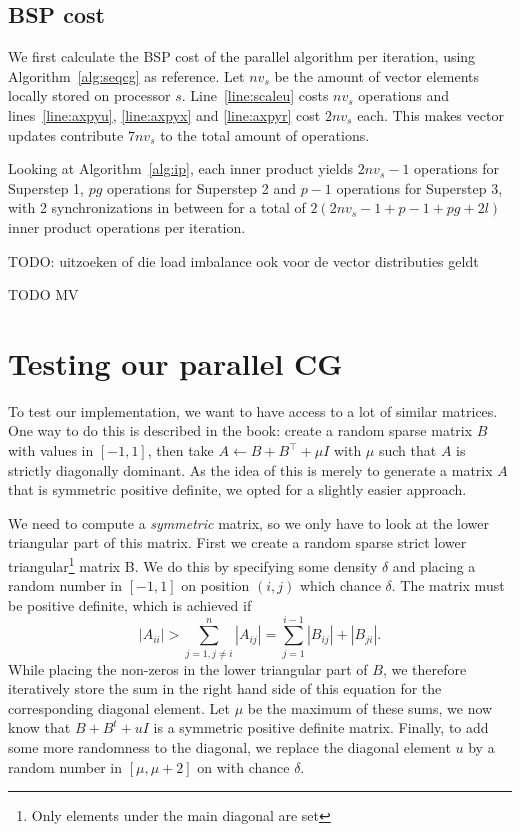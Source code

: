 \documentclass[11pt]{amsart}
\theoremstyle{definition}
\begin{document}
\subsection{BSP cost}
We first calculate the BSP cost of the parallel algorithm per iteration, using Algorithm~\ref{alg:seqcg} as reference. Let $nv_s$ be the amount of vector elements locally stored on processor $s$. Line~\ref{line:scaleu} costs $nv_s$ operations and lines~\ref{line:axpyu}, \ref{line:axpyx} and \ref{line:axpyr} cost $2nv_s$ each. This makes vector updates contribute $7nv_s$ to the total amount of operations. 

Looking at Algorithm~\ref{alg:ip}, each inner product yields $2nv_s - 1$ operations for Superstep 1, $pg$ operations for Superstep 2 and $p-1$ operations for Superstep 3, with 2 synchronizations in between for a total of $2(2nv_s - 1 + p-1 + pg + 2l)$ inner product operations per iteration.

TODO: uitzoeken of die load imbalance ook voor de vector distributies geldt

TODO MV

\section{Testing our parallel CG}
To test our implementation, we want to have access to a lot of similar matrices. One way to do this is described in the book: create a random sparse matrix $B$ with values in $[-1,1]$, then take $A \gets B + B^\top + \mu I$ with $\mu$ such that $A$ is strictly diagonally dominant. As the idea of this is merely to generate a matrix $A$ that is symmetric positive definite, we opted for a slightly easier approach. 

We need to compute a \emph{symmetric} matrix, so we only have to look at the lower triangular part of this matrix. First we create a 
random sparse strict lower triangular\footnote{Only elements under the main diagonal are set} matrix B. We do this by specifying some
density $\delta$ and placing a random number in $[-1,1]$ on position $(i,j)$ which chance $\delta$. The matrix
must be positive definite, which is achieved if
\[
|A_{ii}| > \sum_{j=1, j\ne i}^n |A_{ij}|= \sum_{j=1}^{i-1} |B_{ij}| + |B_{ji}|.
\]
While placing the non-zeros in the lower triangular part of $B$, we therefore iteratively store the sum in the right hand side of this equation for the
corresponding diagonal element. Let $\mu$ be the maximum of these sums, we now know that $B + B^t + uI$ is a symmetric
positive definite matrix. Finally, to add some more randomness to the diagonal, we replace the diagonal element $u$ by a random number in $[\mu, \mu + 2]$ on with chance $\delta$.
\end{document}
